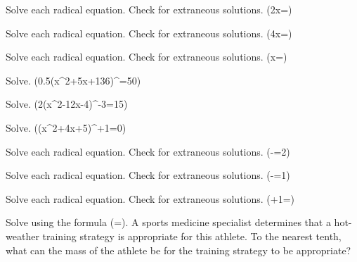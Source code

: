 \documentclass{article}
\newenvironment{practice}[2]{}{}        %
\newcommand{\answer}[1]{}               %
\newcommand{\placeholder}[2]{}          %
\begin{document}
\begin{practice}{30}{1}
Solve each radical equation. Check for extraneous solutions. (2x=)
\answer{(x=\frac{5}{4}) and (x=3)}
\end{practice}

\begin{practice}{31}{1}
Solve each radical equation. Check for extraneous solutions. (4x=)
\answer{(x=1)}
\end{practice}

\begin{practice}{32}{1}
Solve each radical equation. Check for extraneous solutions. (x=)
\answer{(x=7)}
\end{practice}

\begin{practice}{33}{1}
Solve. (0.5(x^2+5x+136)^{}=50)
\answer{(x=27) and (x=-32)}
\end{practice}

\begin{practice}{34}{1}
Solve. (2(x^2-12x-4)^{}-3=15)
\answer{(x=-5) and (x=17)}
\end{practice}

\begin{practice}{35}{1}
Solve. ((x^2+4x+5)^{}+1=0)
\answer{There are no solutions.}
\end{practice}

\begin{practice}{36}{1}
Solve each radical equation. Check for extraneous solutions. (-=2)
\answer{(x=8\frac{1}{16}) or (x=\frac{129}{16})}
\end{practice}

\begin{practice}{37}{1}
Solve each radical equation. Check for extraneous solutions. (-=1)
\answer{(x=-1) and (x=-\frac{5}{9})}
\end{practice}

\begin{practice}{38}{1}
Solve each radical equation. Check for extraneous solutions. (+1=)
\answer{(x=-\frac{3}{4})}
\end{practice}

\begin{practice}{39}{1}
Solve using the formula (=). A sports medicine specialist determines that a hot-weather training strategy is appropriate for this athlete. To the nearest tenth, what can the mass of the athlete be for the training strategy to be appropriate?

\placeholder{illustration}{Athlete in white coat at a finish line with labels "BSA < 2.0" and "165 cm".}
\answer{less than (87.3) kg}
\end{practice}
\end{document}

